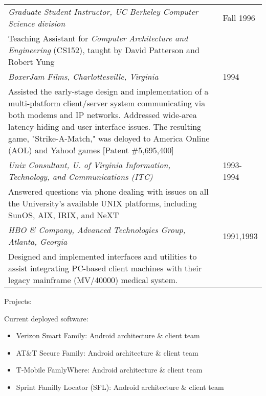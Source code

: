 \begin{tabular}{p{5.2in}@{\hspace{1.5cm}}l}
    \em Graduate Student Instructor, UC Berkeley Computer Science division
                                                                 & Fall 1996 \\
       Teaching Assistant for {\em Computer Architecture and
       Engineering} (CS152), taught by David Patterson and
       Robert Yung \\[9pt]

    \em BoxerJam Films, Charlottesville, Virginia                & 1994 \\
       Assisted the early-stage design and implementation of 
       a multi-platform
       client/server system communicating via both modems and IP
       networks.  Addressed wide-area latency-hiding and user interface
       issues.  The resulting game, "Strike-A-Match,"
       was deloyed to America Online (AOL) and Yahoo! games 
       [Patent \#5,695,400] \\[9pt]

    \em Unix Consultant, U. of Virginia Information, 
         Technology, and Communications  (ITC)              & 1993-1994 \\
       Answered questions via phone dealing with issues on all the
       University's available UNIX platforms, including SunOS,
       AIX, IRIX, and NeXT \\[9pt]

    \em HBO \& Company, Advanced Technologies Group, 
           Atlanta, Georgia                                      & 1991,1993 \\
       Designed and implemented interfaces and utilities to
       assist integrating PC-based client machines with their
       legacy mainframe (MV/40000) medical system. \\[9pt]

\end{tabular}


\bigskip


\newpage
\begin{bf} \large
Projects:
\end{bf}
\medskip

Current deployed software: 
	   	   
	   \begin{itemize}
		\item Verizon Smart Family: Android architecture \& client team \\[-16pt]
		\item AT\&T Secure Family: Android architecture \& client team \\[-16pt]
		\item T-Mobile FamlyWhere: Android architecture \& client team \\[-16pt]
		\item Sprint Familly Locator (SFL): Android architecture \& client team  \\[-16pt]
	\end{itemize}

